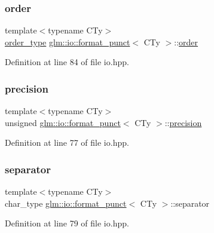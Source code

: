 \subsubsection{\texorpdfstring{order}{order}}
{\footnotesize\ttfamily template$<$typename C\+Ty$>$ \\
\hyperlink{namespaceglm_1_1io_a3497781803fe594a37177e05ab2a795f}{order\+\_\+type} \hyperlink{classglm_1_1io_1_1format__punct}{glm\+::io\+::format\+\_\+punct}$<$ C\+Ty $>$\+::\hyperlink{structglm_1_1io_1_1order}{order}}



Definition at line 84 of file io.\+hpp.

\mbox{\label{classglm_1_1io_1_1format__punct_a5a15d396b7c963df9dec5e124236dc02}} 
\subsubsection{\texorpdfstring{precision}{precision}}
{\footnotesize\ttfamily template$<$typename C\+Ty$>$ \\
unsigned \hyperlink{classglm_1_1io_1_1format__punct}{glm\+::io\+::format\+\_\+punct}$<$ C\+Ty $>$\+::\hyperlink{structglm_1_1io_1_1precision}{precision}}



Definition at line 77 of file io.\+hpp.

\mbox{\label{classglm_1_1io_1_1format__punct_ac561eb04fc2a1282ef38ea15f8e640ee}} 
\subsubsection{\texorpdfstring{separator}{separator}}
{\footnotesize\ttfamily template$<$typename C\+Ty$>$ \\
char\+\_\+type \hyperlink{classglm_1_1io_1_1format__punct}{glm\+::io\+::format\+\_\+punct}$<$ C\+Ty $>$\+::separator}



Definition at line 79 of file io.\+hpp.

